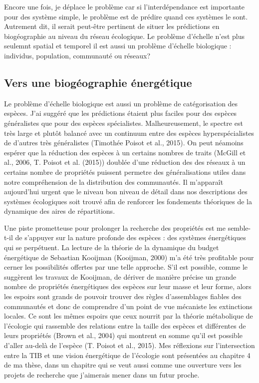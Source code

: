 Encore une fois, je déplace le problème car si l'interdépendance est
importante pour des système simple, le problème est de prédire quand ces
systèmes le sont. Autrement dit, il serait peut-être pertinent de situer
les prédictions en biogéographie au niveau du réseau écologique. Le
problème d'échelle n'est plus seulemnt spatial et temporel il est aussi
un problème d'échelle biologique : individus, population, communauté ou
réseaux?

\subsection*{Vers une biogéographie
énergétique}\label{vers-une-bioguxe9ographie-uxe9nerguxe9tique}

Le problème d'échelle biologique est aussi un problème de catégorisation
des espèces. J'ai suggéré que les prédictions étaient plus faciles pour
des espèces généralistes que pour des espèces spécialistes.
Malheureusement, le spectre est très large et plutôt balancé avec un
continuum entre des espèces hyperspécialistes de d'autres très
généralistes (Timothée Poisot et al., 2015). On peut néamoins espérer
que la réduction des espèces à un certains nombres de traits (McGill et
al., 2006, T. Poisot et al. (2015)) doublée d'une réduction des des
réseaux à un certains nombre de propriétés puissent permetre des
généralisations utiles dans notre compréhension de la distribution des
communautés. Il m'apparaît aujourd'hui urgent que le niveau bon niveau
de détail dans nos descriptions des systèmes écologiques soit trouvé
afin de renforcer les fondements théoriques de la dynamique des aires de
répartitions.

Une piste prometteuse pour prolonger la recherche des propriétés est me
semble-t-il de s'appuyer sur la nature profonde des espèces : des
systèmes énergétiques qui se perpétuent. La lecture de la théorie de la
dynamique du budget énergétique de Sebastian Kooijman (Kooijman, 2000)
m'a été très profitable pour cerner les possibilités offertes par une
telle approche. S'il est possible, comme le suggèrent les travaux de
Kooijman, de dériver de manière précise un grande nombre de propriétés
énergétiques des espèces sur leur masse et leur forme, alors les espoirs
sont grands de pouvoir trouver des règles d'assemblages fiables des
communautés et donc de comprendre d'un point de vue mécaniste les
extinctions locales. Ce sont les mêmes espoirs que ceux nourrit par la
théorie métabolique de l'écologie qui rassemble des relations entre la
taille des espèces et différentes de leurs propriétés (Brown et al.,
2004) qui montrent en somme qu'il est possible d'aller au-delà de
l'espèce (T. Poisot et al., 2015). Mes réflexions sur l'intersection
entre la TIB et une vision énergétique de l'écologie sont présentées au
chapitre 4 de ma thèse, dans un chapitre qui se veut aussi comme une
ouverture vers les projets de recherche que j'aimerais mener dans un
futur proche.

